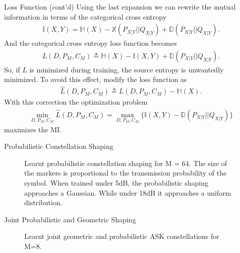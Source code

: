 \documentclass[english,aspectratio=1610,9pt,helvet,nicetitles]{ICEbeamerTUMCD}
\begin{document}
\begin{frame}{Loss Function (cont'd)}
Using the last expansion we can rewrite the mutual information in terms of the categorical cross entropy
\begin{align}
	\mathbb{I} \left(X , Y\right) = \mathbb{H}(X) - \mathbb{X}(P_{X|Y}||Q_{X|Y}) + \mathbb{D}(P_{X|Y}||Q_{X|Y}).
\end{align}
And the categorical cross entropy loss function becomes 
\begin{align}
	L(D, P_M, C_M) \triangleq \mathbb{H}(X) - \mathbb{I} \left(X , Y\right) + \mathbb{D}(P_{X|Y}||Q_{X|Y}).
\end{align}
So, if $L$ is minimized during training, the source entropy is unwantedly minimized. To avoid this effect, \citeauthor{Stark} modify the loss function as
\begin{align}
	\hat{L}(D, P_M, C_M) \triangleq L(D, P_M, C_M) - \mathbb{H}(X).
\end{align}
With this correction the optimization problem 
\begin{align}
	\min_{D, P_M, C_M}\hat{L}(D, P_M, C_M) = \max_{D, P_M, C_M} \{ \mathbb{I} \left(X , Y\right) - \mathbb{D}(P_{X|Y}||Q_{X|Y})\}
\end{align}
maximizes the MI.
\end{frame}

\begin{frame}{Probabilistic Constellation Shaping}
\begin{figure}
	\subfigure[5dB]{
		
		\label{subfig:stark_pcs_5db}
	}
	\subfigure[18db]{
		
		\label{subfig:stark_pcs_18db}
	}
	\caption{Learnt probabilistic constellation shaping for M = 64. The size of the markers is proportional to the transmission probability of the symbol. When trained under 5dB, the probabilistic shaping approaches a Gaussian. While under 18dB it approaches a uniform distribution. }
\end{figure}
\end{frame}

\begin{frame}{Joint Probabilistic and Geometric Shaping}
\begin{figure}[h]
	\subfigure[SNR = 5dB]{
         
         \label{subfig:stark5dB}
    }
    \subfigure[SNR = 18dB]{
         
         \label{subfig:stark18dB}
    }
    \caption{Learnt joint geometric and probabilistic ASK constellations for M=8.}
    \label{fig:starkMASK}
\end{figure}

\end{frame}
\end{document}
